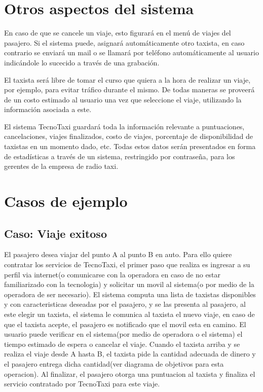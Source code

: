 \section{Otros aspectos del sistema}
En caso de que se cancele un viaje, esto figurará en el menú de viajes del pasajero. Si el sistema puede, asignará automáticamente otro taxista, en caso contrario se enviará un mail o se llamará por teléfono automáticamente al usuario indicándole lo sucecido a través de una grabación.

El taxista será libre de tomar el curso que quiera a la hora de realizar un viaje, por ejemplo, para evitar tráfico durante el mismo. De todas maneras se proveerá de un costo estimado al usuario una vez que seleccione el viaje, utilizando la información asociada a este.

El sistema TecnoTaxi guardará toda la información relevante a puntuaciones, cancelaciones, viajes finalizados, costo de viajes, porcentaje de disponibilidad de taxistas en un momento dado, etc. Todas estos datos serán presentados en forma de estadísticas a través de un sistema, restringido por contraseña, para los gerentes de la empresa de radio taxi. 

\section{Casos de ejemplo}
\subsection{Caso: Viaje exitoso}
El pasajero desea viajar del punto A al punto B en auto. Para ello quiere contratar los servicios de TecnoTaxi, el primer paso que realiza es ingresar a su perfil via internet(o comunicarse con la operadora en caso de no estar familiarizado con la tecnologia) y solicitar un movil al sistema(o por medio de la operadora de ser necesario). El sistema computa una lista de taxistas disponibles y con caracteristicas deseadas por el pasajero, y se las presenta al pasajero, al este elegir un taxista, el sistema le comunica al taxista el nuevo viaje, en caso de que el taxista acepte, el pasajero es notificado que el movil esta en camino. El usuario puede verificar en el sistema(por medio de operadora o el sistema) el tiempo estimado de espera o cancelar el viaje. Cuando el taxista arriba y se realiza el viaje desde A hasta B, el taxista pide la cantidad adecuada de dinero y el pasajero entrega dicha cantidad(ver diagrama de objetivos para esta operacion). Al finalizar, el pasajero otorga una puntuacion al taxista y finaliza el servicio contratado por TecnoTaxi para este viaje.

